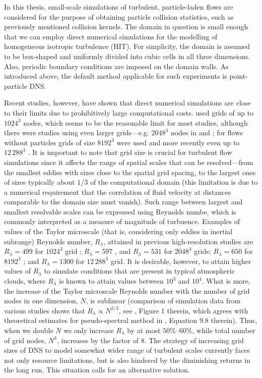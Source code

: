 \documentclass{pracamgren}
\begin{document}
\smallskip

In this thesis, small-scale simulations of turbulent, particle-laden flows are considered for the purpose of obtaining particle collision statistics, such as previously mentioned collision kernels.
The domain in question is small enough that we can employ direct numerical simulations for the modelling of homogeneous isotropic turbulence (HIT).
For simplicity, the domain is assumed to be box-shaped and uniformly divided into cubic cells in all three dimensions.
Also, periodic boundary conditions are imposed on the domain walls.
As introduced above, the default method applicable for such experiments is point-particle DNS.

Recent studies, however, have shown that direct numerical simulations are close to their limits due to prohibitively large computational costs.
\textcite{Rosa2013,Rosa2016} used grids of up to $1024^3$ nodes, which seems to be the reasonable limit for most studies, although there were studies using even larger grids---e.g. $2048^3$ nodes in \textcite{Ireland2016} and \textcite{Matsuda2021}; for flows without particles grids of size $8192^3$ were used \parencite{Buaria2019} and more recently even up to $12\,288^{3}$ \parencite{Buaria2020}.
It is important to note that grid size is crucial for turbulent flow simulations since it affects the range of spatial scales that can be resolved---from the smallest eddies with sizes close to the spatial grid spacing, to the largest ones of sizes typically about $1/3$ of the computational domain (this limitation is due to a numerical requirement that the correlation of fluid velocity at distances comparable to the domain size must vanish).
Such range between largest and smallest resolvable scales can be expressed using Reynolds numbe, which is commonly interpreted as a measure of magnitude of turbuence.
Examples of values of the Taylor microscale (that is, considering only eddies in inertial subrange) Reynolds number, $R_{\lambda}$, attained in previous high-resolution studies are $R_{\lambda} = 499$ for $1024^3$ grid \parencite{Rosa2013,Rosa2016}; $R_{\lambda} = 597$ \parencite{Ireland2016}, and $R_{\lambda} = 531$ \parencite{Matsuda2021} for $2048^3$ grids; $R_{\lambda} = 650$ for $8192^3$ \parencite{Buaria2019}; and $R_{\lambda} = 1300$ for $12\,288^3$ grid.
It is desirable, however, to attain higher values of $R_{\lambda}$ to simulate conditions that are present in typical atmospheric clouds, where $R_{\lambda}$ is known to attain values between $10^{3}$ and $10^{4}$.
What is more, the increase of the Taylor microscale Reynolds number with the number of grid nodes in one dimension, $N$, is sublinear (comparison of simulation data from various studies shows that $R_{\lambda} \propto N^{2/3}$, see \cite{Wang2009}, Figure 1 therein, which agrees with theoretical estimates for pseudo-spectral method in \cite{Pope2000}, Equation 9.8 therein).
Thus, when we double $N$ we only increase $R_{\lambda}$ by at most $50\% \text{--} 60\%$, while total number of grid nodes, $N^3$, increases by the factor of $8$.
The strategy of increasing grid sizes of DNS to model somewhat wider range of turbulent scales currently faces not only resource limitations, but is also hindered by the diminishing returns in the long run.
This situation calls for an alternative solution.
\end{document}
